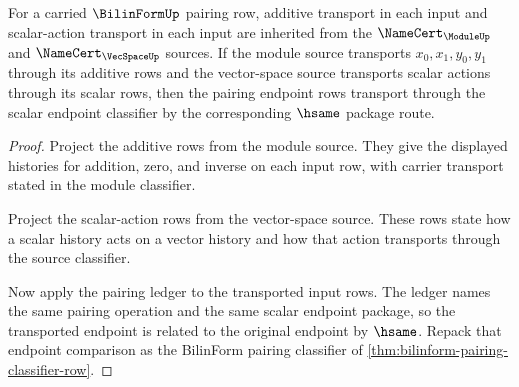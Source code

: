 \begin{theorem}
\label{thm:bilinform-bilinearity-transport-row}
For a carried $\BilinFormUp$ pairing row, additive transport in each input and
scalar-action transport in each input are inherited from the
$\NameCert_{\ModuleUp}$ and $\NameCert_{\VecSpaceUp}$ sources. If the module
source transports $x_0,x_1,y_0,y_1$ through its additive rows and the
vector-space source transports scalar actions through its scalar rows, then
the pairing endpoint rows transport through the scalar endpoint classifier by
the corresponding $\hsame$ package route.
\end{theorem}
\begin{proof}
Project the additive rows from the module source. They give the displayed
histories for addition, zero, and inverse on each input row, with carrier
transport stated in the module classifier.

Project the scalar-action rows from the vector-space source. These rows state
how a scalar history acts on a vector history and how that action transports
through the source classifier.

Now apply the pairing ledger to the transported input rows. The ledger names
the same pairing operation and the same scalar endpoint package, so the
transported endpoint is related to the original endpoint by $\hsame$. Repack
that endpoint comparison as the BilinForm pairing classifier of
\autoref{thm:bilinform-pairing-classifier-row}.
\end{proof}

